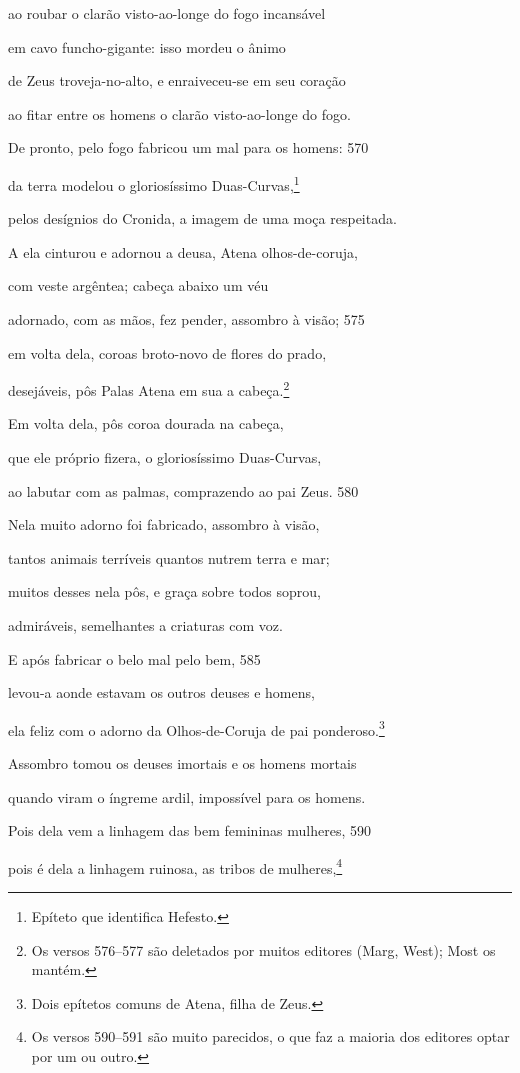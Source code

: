 ao roubar o clarão visto-ao-longe do fogo incansável

em cavo funcho-gigante: isso mordeu o ânimo

de Zeus troveja-no-alto, e enraiveceu-se em seu coração

ao fitar entre os homens o clarão visto-ao-longe do fogo.

De pronto, pelo fogo fabricou um mal para os homens: \num{570}

da terra modelou o gloriosíssimo Duas-Curvas,\footnote{Epíteto que identifica Hefesto.}

pelos desígnios do Cronida, a imagem de uma moça \qb{}respeitada.

A ela cinturou e adornou a deusa, Atena olhos-de-coruja,

com veste argêntea; cabeça abaixo um véu

adornado, com as mãos, fez pender, assombro à visão; \num{575}

em volta dela, coroas broto-novo de flores do prado,

desejáveis, pôs Palas Atena em sua a cabeça.\footnote{Os versos 576--577 são deletados por muitos editores (Marg, West); Most os mantém.}

Em volta dela, pôs coroa dourada na cabeça,

que ele próprio fizera, o gloriosíssimo Duas-Curvas,

ao labutar com as palmas, comprazendo ao pai Zeus. \num{580}

Nela muito adorno foi fabricado, assombro à visão,

tantos animais terríveis quantos nutrem terra e mar;

muitos desses nela pôs, e graça sobre todos soprou,

admiráveis, semelhantes a criaturas com voz.

\quad{}E após fabricar o belo mal pelo bem, \num{585}

levou-a aonde estavam os outros deuses e homens,

ela feliz com o adorno da Olhos-de-Coruja de pai \qb{}ponderoso.\footnote{Dois epítetos comuns de Atena, filha de Zeus.}

Assombro tomou os deuses imortais e os homens mortais

quando viram o íngreme ardil, impossível para os homens.

Pois dela vem a linhagem das bem femininas mulheres, \num{590}

pois é dela a linhagem ruinosa, as tribos de mulheres,\footnote{Os versos 590--591 são muito parecidos, o que faz a maioria dos editores optar
por um ou outro.}

